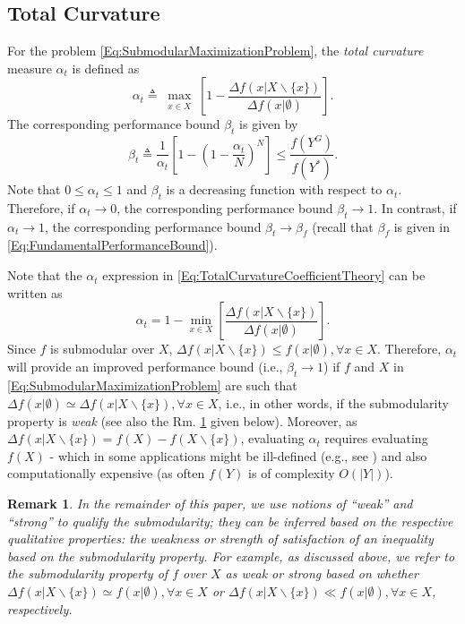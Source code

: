 \documentclass[conference]{IEEEtran}
\newtheorem{remark}{Remark}
\begin{document}
\subsection{Total Curvature \cite{Conforti1984}}
\label{SubSec:TotalCurvature}

For the problem \eqref{Eq:SubmodularMaximizationProblem}, the \emph{total curvature} measure $\alpha_t$ is defined as 
\begin{equation}\label{Eq:TotalCurvatureCoefficientTheory}
    \alpha_t \triangleq \max_{\substack{x \in X} }\left[1 - \frac{\Delta f(x \vert X \backslash \{x\})}{\Delta f(x \vert \emptyset)}\right].
\end{equation}
The corresponding performance bound $\beta_t$ is given by
\begin{equation}\label{Eq:TotalCurvatureBoundTheory}
    \beta_t \triangleq \frac{1}{\alpha_t} \left[ 1 - \left( 1 -\frac{\alpha_t}{N} \right)^N \right] \leq \frac{f(Y^G)}{f(Y^*)}.
\end{equation}
Note that $0 \leq \alpha_t \leq 1$ and $\beta_t$ is a decreasing function with respect to $\alpha_t$. Therefore, if $\alpha_t\rightarrow 0$, the corresponding performance bound $\beta_t\rightarrow 1$. In contrast, if $\alpha_t\rightarrow 1$, the corresponding performance bound $\beta_t\rightarrow\beta_f$ (recall that $\beta_f$ is given in \eqref{Eq:FundamentalPerformanceBound}).


Note that the $\alpha_t$ expression in \eqref{Eq:TotalCurvatureCoefficientTheory} can be written as
$$ 
    \alpha_t = 1 - \min_{x \in X}\left[\frac{\Delta f(x \vert X \backslash \{x\})}{\Delta f(x \vert \emptyset)}\right].
$$
Since $f$ is submodular over $X$, $\Delta f(x \vert X \backslash \{x\}) \leq f(x \vert \emptyset), \forall x \in X$. Therefore, $\alpha_t$ will provide an improved performance bound (i.e., $\beta_t \rightarrow 1$) if $f$ and $X$ in \eqref{Eq:SubmodularMaximizationProblem} are such that $\Delta f(x \vert \emptyset) \simeq \Delta f(x \vert X \backslash \{x\}), \forall x \in X$, i.e., in other words, if the submodularity property is \emph{weak} (see also the Rm. \ref{Rm:SubmodularityStrength} given below). Moreover, as $\Delta f(x \vert X \backslash \{x\}) = f(X) - f(X \backslash \{x\})$, evaluating $\alpha_t$ requires evaluating $f(X)$ - which in some applications might be ill-defined (e.g., see \cite{Sun2020}) and also computationally expensive (as often $f(Y)$ is of complexity $O(\vert Y \vert)$). 

\begin{remark}\label{Rm:SubmodularityStrength}
In the remainder of this paper, we use notions of ``weak'' and ``strong'' to qualify the submodularity; they can be inferred based on the respective qualitative properties: the weakness or strength of satisfaction of an inequality based on the submodularity property. For example, as discussed above, we refer to the submodularity property of $f$ over $X$ as weak or strong based on whether $\Delta f(x \vert X \backslash \{x\}) \simeq f(x \vert \emptyset), \forall x \in X$ or 
$\Delta f(x \vert X \backslash \{x\}) \ll f(x \vert \emptyset), \forall x \in X$, respectively. 
\end{remark}
\end{document}
